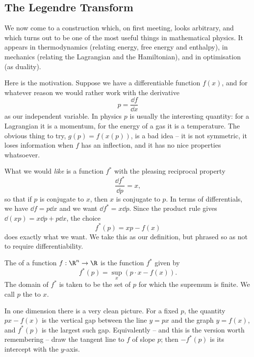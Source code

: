 \documentclass[a4paper]{scrartcl}
\begin{document}
\subsection{The Legendre Transform}

We now come to a construction which, on first meeting, looks arbitrary, and which turns out to be one of the most useful things in mathematical physics. It appears in thermodynamics (relating energy, free energy and enthalpy), in mechanics (relating the Lagrangian and the Hamiltonian), and in optimisation (as duality).

Here is the motivation. Suppose we have a differentiable function $f(x)$, and for whatever reason we would rather work with the derivative
$$
p = \frac{\dd f}{\dd x}
$$
as our independent variable. In physics $p$ is usually the interesting quantity: for a Lagrangian it is a momentum, for the energy of a gas it is a temperature. The obvious thing to try, $g(p) = f(x(p))$, is a bad idea -- it is not symmetric, it loses information when $f$ has an inflection, and it has no nice properties whatsoever.

What we would \emph{like} is a function $f^*$ with the pleasing reciprocal property
$$
\frac{\dd f^*}{\dd p} = x,
$$
so that if $p$ is conjugate to $x$, then $x$ is conjugate to $p$. In terms of differentials, we have $\dd f = p \dd x$ and we want $\dd f^* = x \dd p$. Since the product rule gives $\dd(xp) = x \dd p + p \dd x$, the choice
$$
f^*(p) = xp - f(x)
$$
does exactly what we want. We take this as our definition, but phrased so as not to require differentiability.

\begin{definition}
	The  of a function $f: \R^n \rightarrow \R$ is the function $f^*$ given by
	$$
	f^*(p) = \sup_x \left(p \cdot x - f(x)\right).
	$$
	The domain of $f^*$ is taken to be the set of $p$ for which the supremum is finite. We call $p$ the  to $x$.
\end{definition}

In one dimension there is a very clean picture. For a fixed $p$, the quantity $px - f(x)$ is the vertical gap between the line $y = px$ and the graph $y = f(x)$, and $f^*(p)$ is the largest such gap. Equivalently -- and this is the version worth remembering -- draw the tangent line to $f$ of slope $p$; then $-f^*(p)$ is its intercept with the $y$-axis.
\end{document}
